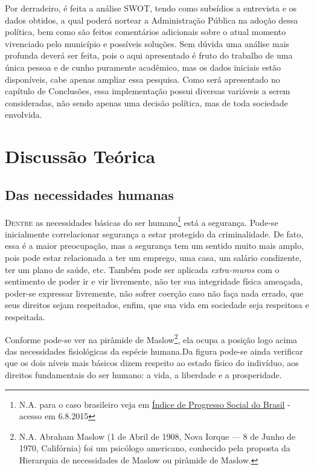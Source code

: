 \documentclass[
	12pt,				%
	openright,			%
	twoside,			%
	a4paper,			%
	chapter=TITLE,		%
	section=TITLE,		%
	subsection=TITLE,	%
	subsubsection=TITLE,%
	spanish,            %
	english,			%
	brazil				%
	]{abntex2}
\begin{document}
\par
Por derradeiro, é feita a análise SWOT, tendo como subsídios a entrevista e os  dados obtidos, a qual poderá nortear a Administração Pública na adoção dessa política, bem como são feitos comentários adicionais sobre o atual momento vivenciado pelo município e possíveis soluções. Sem dúvida uma análise mais profunda deverá ser feita, pois
o aqui apresentado é fruto do trabalho de uma única pessoa e de cunho puramente acadêmico, mas os dados iniciais estão disponíveis, cabe apenas ampliar essa pesquisa. Como será apresentado no capítulo de Conclusões, essa implementação possui diversas variáveis a serem consideradas, não sendo apenas uma decisão política, mas de toda sociedade envolvida.

\chapter{Discussão Teórica}

\section{Das necessidades humanas}

\lettrine[lines=2, lhang=0.33, loversize=0.25]{D}{entre} as necessidades básicas do ser humano\footnote{N.A. para o caso brasileiro veja em \href{http://www.socialprogressimperative.org/pt/data/spi/countries/BRA\#scorecard/components/BRA/}{Índice de Progresso Social do Brasil} - acesso em 6.8.2015} está a segurança. Pode-se inicialmente correlacionar
segurança a estar protegido da criminalidade. De fato, essa é a maior preocupação, mas a segurança tem um
sentido muito mais amplo, pois pode estar relacionada a ter um emprego, uma casa, um salário condizente,
ter um plano de saúde, etc. Também pode ser aplicada \textit{extra-muros} com o sentimento de poder ir e vir livremente, não ter sua integridade física ameaçada, poder-se expressar livremente, não sofrer coerção caso não faça nada errado, que seus direitos sejam respeitados, enfim, que sua vida em sociedade seja respeitosa e respeitada.
\par
 Conforme pode-se ver na pirâmide de Maslow\footnote{N.A. Abraham Maslow (1 de
Abril de 1908, Nova Iorque — 8 de Junho de 1970, Califórnia) foi um psicólogo americano, conhecido pela
proposta da Hierarquia de necessidades de Maslow ou pirâmide de Maslow.}, ela ocupa a posição logo acima
das necessidades fisiológicas da espécie humana.Da figura pode-se ainda verificar que os dois níveis mais básicos dizem respeito ao estado físico do indivíduo, aos direitos fundamentais do ser humano: a vida, a liberdade e a prosperidade.
\end{document}
